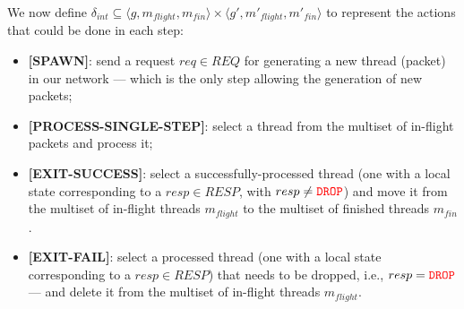 We now define $\delta_{int} \subseteq \langle g,m_{flight},m_{fin} 
\rangle \times \langle g',m'_{flight},m'_{fin} \rangle$ to represent the 
actions that could be done in each step: 
\begin{itemize}
	
	\item
	\textbf{[SPAWN]}:
	send a request $req\in REQ$ for generating a new thread (packet) in our 
	network --- which is the only step allowing the generation of new 
	packets;
	
	\item 
	\textbf{[PROCESS-SINGLE-STEP]}:
	select a thread from the multiset of in-flight packets and process it; 
	
	\item 
	\textbf{[EXIT-SUCCESS]}:
	select a successfully-processed thread (one with a local state 
	corresponding to a $resp \in RESP$, with $resp\neq \textcolor{red}{\texttt{DROP}}$) and move it 
	from the multiset of in-flight threads $m_{flight}$ to the multiset of 
	finished threads $m_{fin}$.
	
	\item 
	\textbf{[EXIT-FAIL]}:
	select a processed thread (one with a local state corresponding to a $resp 
	\in RESP$) that needs to be dropped, i.e., $resp= \textcolor{red}{\texttt{DROP}}$ --- and 
	delete it from the multiset of in-flight threads $m_{flight}$.
\end{itemize}






